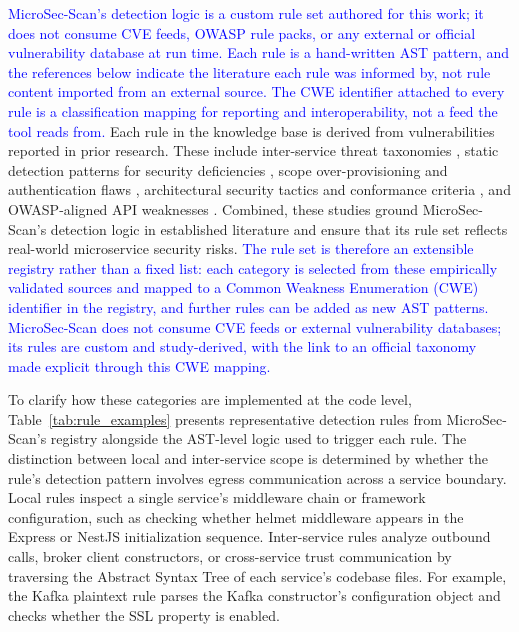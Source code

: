 \documentclass[preprint,12pt]{elsarticle}
\newcommand{\new}[1]{\textcolor{blue}{#1}}
\begin{document}
\new{MicroSec-Scan's detection logic is a custom rule set authored for this
work; it does not consume CVE feeds, OWASP rule packs, or any external or
official vulnerability database at run time. Each rule is a hand-written AST
pattern, and the references below indicate the literature each rule was
informed by, not rule content imported from an external source. The CWE
identifier attached to every rule is a classification mapping for reporting
and interoperability, not a feed the tool reads from.}
Each rule in the knowledge base is derived from vulnerabilities reported in prior research. These include inter-service threat taxonomies \cite{haindl2024systematic}, static detection patterns for security deficiencies \cite{unver2023pomegranate}, scope over-provisioning and authentication flaws \cite{kalubowila2021optimization}, architectural security tactics and conformance criteria \cite{zdun2024tactics}, and OWASP-aligned API weaknesses \cite{mujahid2024owasp}. Combined, these studies ground MicroSec-Scan’s detection logic in established literature and ensure that its rule set reflects real-world microservice security risks. \new{The rule set is therefore an extensible registry rather than a fixed list: each category is selected from these empirically validated sources and mapped to a Common Weakness Enumeration (CWE) identifier in the registry, and further rules can be added as new AST patterns. MicroSec-Scan does not consume CVE feeds or external vulnerability databases; its rules are custom and study-derived, with the link to an official taxonomy made explicit through this CWE mapping.}

To clarify how these categories are implemented at the code level, Table~\ref{tab:rule_examples} presents representative detection rules from MicroSec-Scan's registry alongside the AST-level logic used to trigger each rule. The distinction between local and inter-service scope is determined by whether the rule's detection pattern involves egress communication across a service boundary. Local rules inspect a single service's middleware chain or framework configuration, such as checking whether helmet middleware appears in the Express or NestJS initialization sequence. Inter-service rules analyze outbound calls, broker client constructors, or cross-service trust communication by traversing the Abstract Syntax Tree of each service's codebase files. For example, the Kafka plaintext rule parses the Kafka constructor's configuration object and checks whether the SSL property is enabled. 
\end{document}
